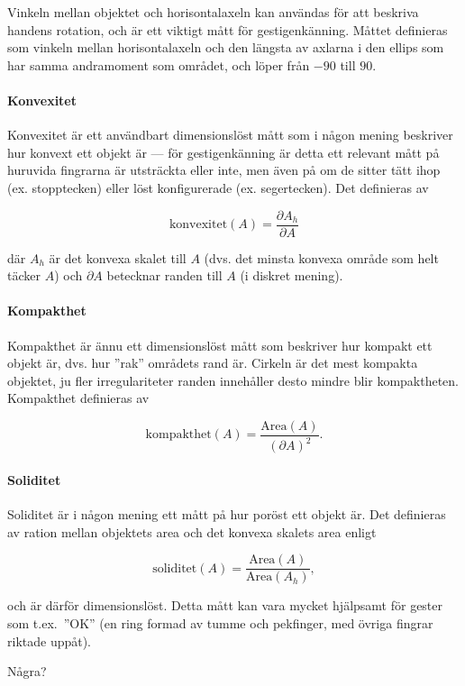 \documentclass[../rapport_MVEX01-11-05]{subfiles}
\begin{document}
Vinkeln mellan objektet och horisontalaxeln kan användas för att
beskriva handens rotation, och är ett viktigt mått för
gestigenkänning. Måttet definieras som vinkeln mellan horisontalaxeln
och den längsta av axlarna i den ellips som har samma andramoment som
området, och löper från $-90$\textdegree{} till $90$\textdegree{}.


\paragraph{Konvexitet}

Konvexitet \cite[s.~26]{Rudemo09} är ett användbart dimensionslöst
mått som i någon mening beskriver hur konvext ett objekt är --- för
gestigenkänning är detta ett relevant mått på huruvida fingrarna är
utsträckta eller inte, men även på om de sitter tätt ihop (ex.
stopptecken) eller löst konfigurerade (ex. segertecken). Det
definieras av

\begin{equation*}
  \textrm{konvexitet}(A) = \frac{\partial A_h}{\partial A}
\end{equation*}

där $A_h$ är det konvexa skalet till $A$ (dvs. det minsta konvexa område som
helt täcker $A$) och $\partial A$ betecknar randen till $A$ (i diskret
mening).

\paragraph{Kompakthet}

Kompakthet \cite[s.~26]{Rudemo09} är ännu ett dimensionslöst mått som
beskriver hur kompakt ett objekt är, dvs. hur ''rak'' områdets rand
är. Cirkeln är det mest kompakta objektet, ju fler irregulariteter
randen innehåller desto mindre blir kompaktheten. Kompakthet
definieras av

\begin{equation*}
  \textrm{kompakthet}(A) = \frac{\textrm{Area}(A)}{\left(\partial
  A\right)^2}.
\end{equation*}

\paragraph{Soliditet}

Soliditet är i någon mening ett mått på hur poröst ett objekt är. Det
definieras av ration mellan objektets area och det konvexa skalets
area enligt

\begin{equation*}
  \textrm{soliditet}(A) = \frac{\textrm{Area}(A)}{\textrm{Area}(A_h)},
\end{equation*}

och är därför dimensionslöst. Detta mått kan vara mycket hjälpsamt för
gester som t.ex.~''OK'' (en ring formad av tumme och pekfinger, med
övriga fingrar riktade uppåt).

Några?
\end{document}
